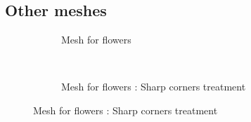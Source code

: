 \subsection{Other meshes}
\begin{figure}[h!]
    \begin{subfigure}[b]{1\linewidth}
        \centering
        \caption{Mesh for flowers}
    \end{subfigure}
    \\
    \begin{subfigure}[b]{1\linewidth}
        \centering
        \caption{Mesh for flowers : Sharp corners treatment}
    \end{subfigure}
\end{figure}

